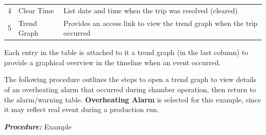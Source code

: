 \begin{longtable}[]{@{}lll@{}}
\begin{minipage}[t]{0.04\columnwidth}
4\strut
\end{minipage} & \begin{minipage}[t]{0.23\columnwidth}\raggedright
Clear Time\strut
\end{minipage} & \begin{minipage}[t]{0.65\columnwidth}\raggedright
List date and time when the trip was resolved (cleared)\strut
\end{minipage}\tabularnewline
\begin{minipage}[t]{0.04\columnwidth}\raggedright
5\strut
\end{minipage} & \begin{minipage}[t]{0.23\columnwidth}\raggedright
Trend Graph\strut
\end{minipage} & \begin{minipage}[t]{0.65\columnwidth}\raggedright
Provides an access link to view the trend graph when the trip
occurred\strut
\end{minipage}\tabularnewline
\bottomrule
\end{longtable}

Each entry in the table is attached to it a trend graph (in the last
column) to provide a graphical overview in the timeline when an event
occurred.

The following procedure outlines the steps to open a trend graph to view
details of an overheating alarm that occurred during chamber operation,
then return to the alarm/warning table. \textbf{Overheating Alarm} is
selected for this example, since it may reflect real event during a
production run.

\textbf{\emph{Procedure:}} Example

